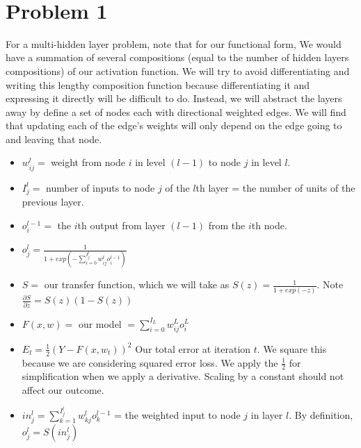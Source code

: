 \documentclass[11pt]{article}
\begin{document}
\begin{center}

\ \\
\end{center}

\section*{Problem 1}

\vspace{5 mm}
\noindent
For a multi-hidden layer problem, note that for our functional form, We would 
have a summation of several compositions (equal to the number of hidden layers 
compositions) of our activation function. We will try to avoid differentiating 
and writing this lengthy composition function because differentiating it and 
expressing it directly will be difficult to do. Instead, we will abstract the 
layers away by define a set of nodes each with directional weighted edges. We 
will find that updating each of the edge's weights will only depend on the 
edge going to and leaving that node. 

\begin{itemize}
\item $w_{ij}^{l} = $ weight from node $i$ in level $(l - 1)$ to node $j$ in 
level $l$.
\item $I_{j}^{l} = $ number of inputs to node $j$ of the $l$th layer = 
the number of units of the previous layer.
\item $o_{i}^{l - 1} = $ the $i$th output from layer $(l -1)$ from the $i$th 
node.
\item $o_{j}^{l} = \frac{1}{1 + exp(-\sum_{i = 0}^{I_{j}^{l}} 
w_{ij}^{l} o_{i}^{l - 1})}$
\item $S = $ our transfer function, which we will take as $S(z) = 
\frac{1}{1 + exp(-z)}$. Note $\frac{\partial S}{\partial z} = S(z)(1 - S(z))$
\item $F(x, w) = $ our model $ = \sum_{i = 0}^{I_{L}} w_{ij}^{L} o_{i}^{L}$
\item $E_{t} = \frac{1}{2}(Y - F(x, w_{t}))^{2} $ Our total error at iteration 
$t$. We square this because we are considering squared error loss. We apply the 
$\frac{1}{2}$ for simplification when we apply a derivative. Scaling by a 
constant should not affect our outcome.
\item $in_{j}^{l} = \sum_{k = 1}^{I_{j}^{l}} w_{kj}^{l} o_{k}^{l - 1} $ = the 
weighted input to node $j$ in layer $l$. By definition, 
$o_{j}^{l} = S(in_{j}^{l})$
\end{itemize}
\end{document}
